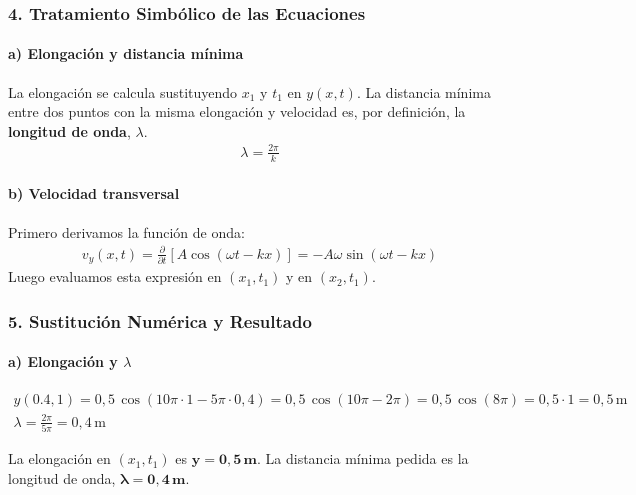 \subsubsection*{4. Tratamiento Simbólico de las Ecuaciones}
\paragraph{a) Elongación y distancia mínima}
La elongación se calcula sustituyendo $x_1$ y $t_1$ en $y(x,t)$. La distancia mínima entre dos puntos con la misma elongación y velocidad es, por definición, la \textbf{longitud de onda}, $\lambda$.
\begin{gather}
    \lambda = \frac{2\pi}{k}
\end{gather}
\paragraph{b) Velocidad transversal}
Primero derivamos la función de onda:
\begin{gather}
    v_y(x,t) = \frac{\partial}{\partial t}[A\cos(\omega t - kx)] = -A\omega\sin(\omega t - kx)
\end{gather}
Luego evaluamos esta expresión en $(x_1, t_1)$ y en $(x_2, t_1)$.
\subsubsection*{5. Sustitución Numérica y Resultado}
\paragraph{a) Elongación y $\lambda$}
\begin{gather}
    y(0.4, 1) = 0,5\,\cos(10\pi \cdot 1 - 5\pi \cdot 0,4) = 0,5\,\cos(10\pi - 2\pi) = 0,5\,\cos(8\pi) = 0,5 \cdot 1 = 0,5\,\text{m} \\
    \lambda = \frac{2\pi}{5\pi} = 0,4\,\text{m}
\end{gather}
\begin{cajaresultado}
    La elongación en $(x_1, t_1)$ es $\boldsymbol{y=0,5\,\textbf{m}}$. La distancia mínima pedida es la longitud de onda, $\boldsymbol{\lambda=0,4\,\textbf{m}}$.
\end{cajaresultado}
